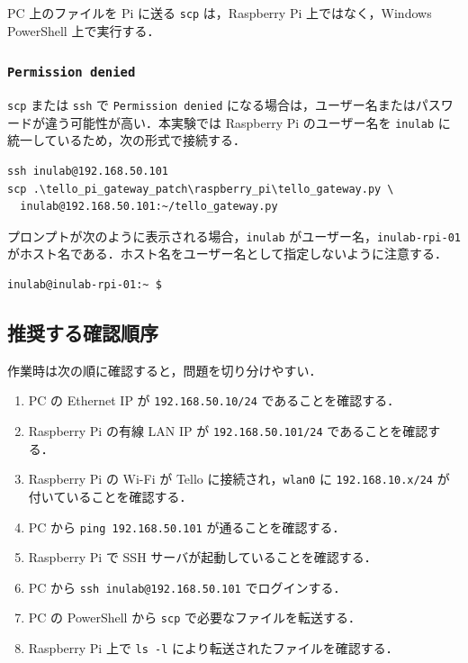 PC 上のファイルを Pi に送る \texttt{scp} は，Raspberry Pi 上ではなく，Windows PowerShell 上で実行する．

\subsubsection{\texttt{Permission denied}}

\texttt{scp} または \texttt{ssh} で \texttt{Permission denied} になる場合は，ユーザー名またはパスワードが違う可能性が高い．本実験では Raspberry Pi のユーザー名を \texttt{inulab} に統一しているため，次の形式で接続する．

\begin{lstlisting}
ssh inulab@192.168.50.101
scp .\tello_pi_gateway_patch\raspberry_pi\tello_gateway.py \
  inulab@192.168.50.101:~/tello_gateway.py
\end{lstlisting}

プロンプトが次のように表示される場合，\texttt{inulab} がユーザー名，\texttt{inulab-rpi-01} がホスト名である．ホスト名をユーザー名として指定しないように注意する．

\begin{lstlisting}
inulab@inulab-rpi-01:~ $
\end{lstlisting}

\subsection{推奨する確認順序}

作業時は次の順に確認すると，問題を切り分けやすい．

\begin{enumerate}[label=\arabic*.]
  \item PC の Ethernet IP が \texttt{192.168.50.10/24} であることを確認する．
  \item Raspberry Pi の有線 LAN IP が \texttt{192.168.50.101/24} であることを確認する．
  \item Raspberry Pi の Wi-Fi が Tello に接続され，\texttt{wlan0} に \texttt{192.168.10.x/24} が付いていることを確認する．
  \item PC から \texttt{ping 192.168.50.101} が通ることを確認する．
  \item Raspberry Pi で SSH サーバが起動していることを確認する．
  \item PC から \texttt{ssh inulab@192.168.50.101} でログインする．
  \item PC の PowerShell から \texttt{scp} で必要なファイルを転送する．
  \item Raspberry Pi 上で \texttt{ls -l} により転送されたファイルを確認する．
\end{enumerate}

